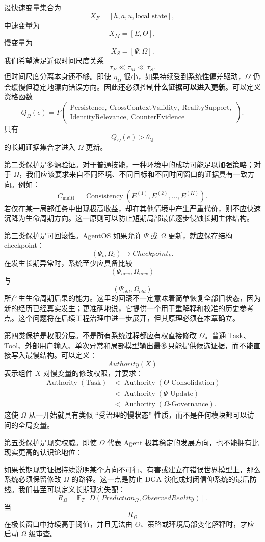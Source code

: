 设快速变量集合为
\[
X_F
=
[h,a,u,\text{local state}],
\]
中速变量为
\[
X_M
=
[E,\Theta],
\]
慢变量为
\[
X_S
=
[\Psi,\Omega].
\]
我们希望满足近似时间尺度关系
\[
\tau_F
\ll
\tau_M
\ll
\tau_S.
\]
但时间尺度分离本身还不够。即使 $\eta_{\Omega}$ 很小，如果持续受到系统性偏差驱动，$\Omega$ 仍会缓慢但稳定地漂向错误方向。因此还必须控制\textbf{什么证据可以进入更新}。可以定义资格函数
\[
Q_{\Omega}(e)
=
F\!\left(
\begin{gathered}
\mathrm{Persistence},\ \mathrm{CrossContextValidity},\ \mathrm{RealitySupport},\\
\mathrm{IdentityRelevance},\ \mathrm{CounterEvidence}
\end{gathered}
\right).
\]
只有
\[
Q_{\Omega}(e)
>
\theta_Q
\]
的长期证据集合才进入 $\Omega$ 更新。

第二类保护是多源验证。对于普通技能，一种环境中的成功可能足以加强策略；对于 $\Omega$，我们应该要求来自不同环境、不同目标和不同时间窗口的证据具有一致方向。例如：
\[
C_{\text{multi}}
=
\operatorname{Consistency}
\left(
E^{(1)},E^{(2)},\ldots,E^{(K)}
\right).
\]
若仅在某一局部任务中出现极高收益，却在其他情境中产生严重代价，则不应快速沉降为生命周期方向。这一原则可以防止短期局部最优逐步侵蚀长期主体结构。

第三类保护是可回滚性。AgentOS 如果允许 $\Psi$ 或 $\Omega$ 更新，就应保存结构 checkpoint：
\[
(\Psi_t,\Omega_t)
\rightarrow
Checkpoint_k.
\]
在发生长期异常时，系统至少应具备比较
\[
(\Psi_{new},\Omega_{new})
\]
与
\[
(\Psi_{old},\Omega_{old})
\]
所产生生命周期后果的能力。这里的回滚不一定意味着简单恢复全部旧状态，因为新的经历已经真实发生；更准确地说，它提供一个用于重解释和校准的历史参考点。这个问题将在后续工程治理中进一步展开，但其原理必须在本章确立。

第四类保护是权限分层。不是所有系统过程都应有权直接修改 $\Omega$。普通 Task、Tool、外部用户输入、单次异常和局部模型输出最多只能提供候选证据，而不能直接写入最慢结构。可以定义：
\[
Authority(X)
\]
表示组件 $X$ 对慢变量的修改权限，并要求：
\[
\begin{aligned}
\operatorname{Authority}(\mathrm{Task})
&<\operatorname{Authority}(\Theta\text{-Consolidation})\\
&<\operatorname{Authority}(\Psi\text{-Update})\\
&<\operatorname{Authority}(\Omega\text{-Governance}).
\end{aligned}
\]
这使 $\Omega$ 从一开始就具有类似 ``受治理的慢状态'' 性质，而不是任何模块都可以访问的全局变量。

第五类保护是现实权威。即使 $\Omega$ 代表 Agent 极其稳定的发展方向，也不能拥有比现实更高的认识论地位：
\begin{statementbox}
\centering
{}
\end{statementbox}
如果长期现实证据持续说明某个方向不可行、有害或建立在错误世界模型上，那么系统必须保留修改 $\Omega$ 的路径。这一点是防止 DGA 演化成封闭信仰系统的最后防线。我们甚至可以定义长期现实失配：
\[
R_{\Omega}
=
\mathbb E_T
\left[
D(
Prediction_{\Omega},
ObservedReality
)
\right].
\]
当
\[
R_{\Omega}
\]
在极长窗口中持续高于阈值，并且无法由 $\Theta$、策略或环境局部变化解释时，才应启动 $\Omega$ 级审查。


